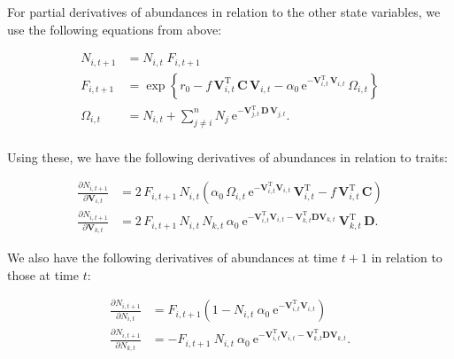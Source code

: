 For partial derivatives of abundances in relation to the other state variables,
we use the following equations from above:


\begin{equation*}
\begin{split}
    N_{i,t+1} &= N_{i,t} \; F_{i,t+1} \\
    F_{i,t+1} &=  \exp \left\{
        r_0 - f \, \mathbf{V}_{i,t}^{\text{T}} \, \mathbf{C} \, \mathbf{V}_{i,t} - 
        \alpha_0 \, \text{e}^{-\mathbf{V}_{i,t}^{\text{T}} \, \mathbf{V}_{i,t}} \,
        \Omega_{i,t}
    \right\} \\
    \Omega_{i,t} &= N_{i,t} + \sum_{j \ne i}^{n}{ N_j \:
        \text{e}^{- \mathbf{V}_{j,t}^{\text{T}} \, \mathbf{D} \, \mathbf{V}_{j,t} } }
    \textrm{.} \\
\end{split}
\end{equation*}



Using these, we have the following derivatives of abundances in relation
to traits:

\begin{equation*}
\begin{split}
    \frac{ \partial N_{i,t+1} }{ \partial \mathbf{V}_{i,t} } &= 
        2 \, F_{i,t+1} \,  N_{i,t}
        \left(
            \alpha_0 \, \Omega_{i,t} \, \text{e}^{ -\mathbf{V}_{i,t}^{\text{T}}
            \mathbf{V}_{i,t} } \, \mathbf{V}_{i,t}^{\text{T}}
            - f \, \mathbf{V}_{i,t}^{\text{T}} \, \mathbf{C}
        \right) \\
    \frac{ \partial N_{i,t+1} }{ \partial \mathbf{V}_{k,t} } &= 
        2 \, F_{i,t+1} \, N_{i,t} \, N_{k,t} \, \alpha_0 \: 
        \text{e}^{ -\mathbf{V}_{i,t}^{\text{T}} \mathbf{V}_{i,t} -
            \mathbf{V}_{k,t}^{\text{T}} \mathbf{D} \mathbf{V}_{k,t} } \:
        \mathbf{V}_{k,t}^{\text{T}} \, \mathbf{D}
    \textrm{.}
\end{split}
\end{equation*}

We also have the following derivatives of abundances at time $t+1$ in relation
to those at time $t$:

\begin{equation*}
\begin{split}
    \frac{ \partial N_{i,t+1} }{ \partial N_{i,t} } &= 
        F_{i,t+1}
        \left(
            1 - N_{i,t} \: \alpha_0 \: 
            \text{e}^{ -\mathbf{V}_{i,t}^{\text{T}} \mathbf{V}_{i,t} } 
        \right) \\
    \frac{ \partial N_{i,t+1} }{ \partial N_{k,t} } &= 
        - F_{i,t+1} \: N_{i,t} \: \alpha_0 \: 
        \text{e}^{ -\mathbf{V}_{i,t}^{\text{T}} \mathbf{V}_{i,t} -
            \mathbf{V}_{k,t}^{\text{T}} \mathbf{D} \mathbf{V}_{k,t} } 
    \textrm{.}
\end{split}
\end{equation*}





